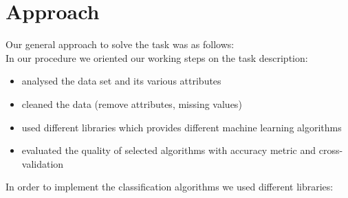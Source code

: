 \section{Approach}
\label{approach}


Our general approach to solve the task was as follows:
\\

In our procedure we oriented our working steps on the task description:
\begin{itemize}
	\item[\textbullet] analysed the data set and its various attributes
	\item[\textbullet] cleaned the data (remove attributes, missing values)
	\item[\textbullet] used different libraries which provides different machine learning algorithms
	\item[\textbullet] evaluated the quality of selected algorithms with accuracy metric and cross-validation
\end{itemize}
In order to implement the classification algorithms we used different libraries: \\
